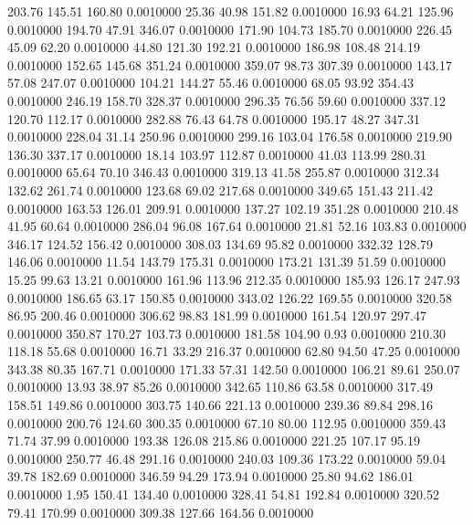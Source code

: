  203.76  145.51  160.80   0.0010000
  25.36   40.98  151.82   0.0010000
  16.93   64.21  125.96   0.0010000
 194.70   47.91  346.07   0.0010000
 171.90  104.73  185.70   0.0010000
 226.45   45.09   62.20   0.0010000
  44.80  121.30  192.21   0.0010000
 186.98  108.48  214.19   0.0010000
 152.65  145.68  351.24   0.0010000
 359.07   98.73  307.39   0.0010000
 143.17   57.08  247.07   0.0010000
 104.21  144.27   55.46   0.0010000
  68.05   93.92  354.43   0.0010000
 246.19  158.70  328.37   0.0010000
 296.35   76.56   59.60   0.0010000
 337.12  120.70  112.17   0.0010000
 282.88   76.43   64.78   0.0010000
 195.17   48.27  347.31   0.0010000
 228.04   31.14  250.96   0.0010000
 299.16  103.04  176.58   0.0010000
 219.90  136.30  337.17   0.0010000
  18.14  103.97  112.87   0.0010000
  41.03  113.99  280.31   0.0010000
  65.64   70.10  346.43   0.0010000
 319.13   41.58  255.87   0.0010000
 312.34  132.62  261.74   0.0010000
 123.68   69.02  217.68   0.0010000
 349.65  151.43  211.42   0.0010000
 163.53  126.01  209.91   0.0010000
 137.27  102.19  351.28   0.0010000
 210.48   41.95   60.64   0.0010000
 286.04   96.08  167.64   0.0010000
  21.81   52.16  103.83   0.0010000
 346.17  124.52  156.42   0.0010000
 308.03  134.69   95.82   0.0010000
 332.32  128.79  146.06   0.0010000
  11.54  143.79  175.31   0.0010000
 173.21  131.39   51.59   0.0010000
  15.25   99.63   13.21   0.0010000
 161.96  113.96  212.35   0.0010000
 185.93  126.17  247.93   0.0010000
 186.65   63.17  150.85   0.0010000
 343.02  126.22  169.55   0.0010000
 320.58   86.95  200.46   0.0010000
 306.62   98.83  181.99   0.0010000
 161.54  120.97  297.47   0.0010000
 350.87  170.27  103.73   0.0010000
 181.58  104.90    0.93   0.0010000
 210.30  118.18   55.68   0.0010000
  16.71   33.29  216.37   0.0010000
  62.80   94.50   47.25   0.0010000
 343.38   80.35  167.71   0.0010000
 171.33   57.31  142.50   0.0010000
 106.21   89.61  250.07   0.0010000
  13.93   38.97   85.26   0.0010000
 342.65  110.86   63.58   0.0010000
 317.49  158.51  149.86   0.0010000
 303.75  140.66  221.13   0.0010000
 239.36   89.84  298.16   0.0010000
 200.76  124.60  300.35   0.0010000
  67.10   80.00  112.95   0.0010000
 359.43   71.74   37.99   0.0010000
 193.38  126.08  215.86   0.0010000
 221.25  107.17   95.19   0.0010000
 250.77   46.48  291.16   0.0010000
 240.03  109.36  173.22   0.0010000
  59.04   39.78  182.69   0.0010000
 346.59   94.29  173.94   0.0010000
  25.80   94.62  186.01   0.0010000
   1.95  150.41  134.40   0.0010000
 328.41   54.81  192.84   0.0010000
 320.52   79.41  170.99   0.0010000
 309.38  127.66  164.56   0.0010000
